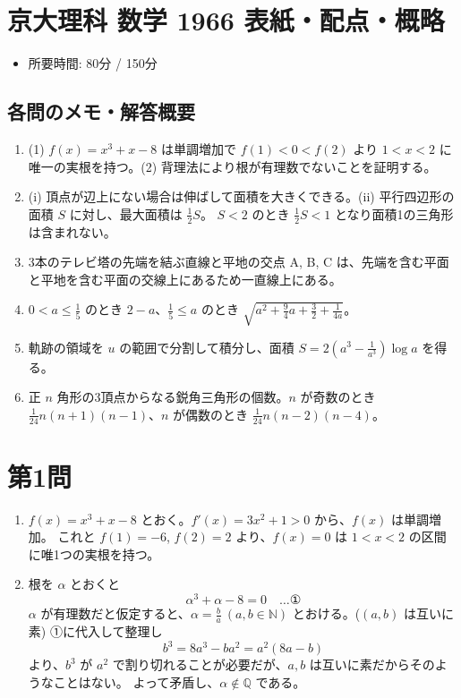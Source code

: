 \documentclass[../main.tex]{subfiles}
\begin{document}
\section*{京大理科 数学 1966 表紙・配点・概略}

\begin{itemize}
  \item 所要時間: 80分 / 150分
\end{itemize}

\subsection*{各問のメモ・解答概要}
\begin{enumerate}
  \item (1) $f(x) = x^3 + x - 8$ は単調増加で $f(1) < 0 < f(2)$ より $1 < x < 2$ に唯一の実根を持つ。(2) 背理法により根が有理数でないことを証明する。
  \item (i) 頂点が辺上にない場合は伸ばして面積を大きくできる。(ii) 平行四辺形の面積 $S$ に対し、最大面積は $\frac{1}{2}S$。 $S < 2$ のとき $\frac{1}{2}S < 1$ となり面積1の三角形は含まれない。
  \item 3本のテレビ塔の先端を結ぶ直線と平地の交点 A, B, C は、先端を含む平面と平地を含む平面の交線上にあるため一直線上にある。
  \item $0 < a \le \frac{1}{5}$ のとき $2-a$、$\frac{1}{5} \le a$ のとき $\sqrt{a^2 + \frac{9}{4}a + \frac{3}{2} + \frac{1}{4a}}$。
  \item 軌跡の領域を $u$ の範囲で分割して積分し、面積 $S = 2\left(a^3 - \frac{1}{a^3}\right)\log a$ を得る。
  \item 正 $n$ 角形の3頂点からなる鋭角三角形の個数。$n$ が奇数のとき $\frac{1}{24}n(n+1)(n-1)$、$n$ が偶数のとき $\frac{1}{24}n(n-2)(n-4)$。
\end{enumerate}

\newpage

\section*{第1問}

\noindent
[\textbf{解}]
\begin{enumerate}
  \item[(1)] $f(x) = x^3 + x - 8$ とおく。$f'(x) = 3x^2 + 1 > 0$ から、$f(x)$ は単調増加。
    これと $f(1) = -6$, $f(2) = 2$ より、$f(x) = 0$ は $1 < x < 2$ の区間に唯1つの実根を持つ。

  \item[(2)] 根を $\alpha$ とおくと
    \[
      \alpha^3 + \alpha - 8 = 0 \quad \dots \text{①}
    \]
    $\alpha$ が有理数だと仮定すると、$\alpha = \frac{b}{a}\ (a, b \in \mathbb{N})$ とおける。($(a, b)$ は互いに素) ①に代入して整理し
    \[
      b^3 = 8a^3 - b a^2 = a^2(8a - b)
    \]
    より、$b^3$ が $a^2$ で割り切れることが必要だが、$a, b$ は互いに素だからそのようなことはない。
    よって矛盾し、$\alpha \notin \mathbb{Q}$ である。
\end{enumerate}
\end{document}
